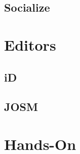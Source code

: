 \documentclass{beamer}
\begin{document}
	\subsection{Socialize}
	
	\section{Editors}
	
	\subsection{iD}
	
	\subsection{JOSM}
	
	\section{Hands-On}
\end{document}
